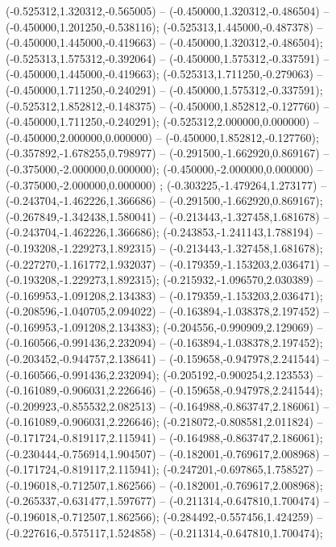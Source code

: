  (-0.525312,1.320312,-0.565005) -- (-0.450000,1.320312,-0.486504) -- (-0.450000,1.201250,-0.538116);
 (-0.525313,1.445000,-0.487378) -- (-0.450000,1.445000,-0.419663) -- (-0.450000,1.320312,-0.486504);
 (-0.525313,1.575312,-0.392064) -- (-0.450000,1.575312,-0.337591) -- (-0.450000,1.445000,-0.419663);
 (-0.525313,1.711250,-0.279063) -- (-0.450000,1.711250,-0.240291) -- (-0.450000,1.575312,-0.337591);
 (-0.525312,1.852812,-0.148375) -- (-0.450000,1.852812,-0.127760) -- (-0.450000,1.711250,-0.240291);
 (-0.525312,2.000000,0.000000) -- (-0.450000,2.000000,0.000000) -- (-0.450000,1.852812,-0.127760);
 (-0.357892,-1.678255,0.798977) -- (-0.291500,-1.662920,0.869167) -- (-0.375000,-2.000000,0.000000);
 (-0.450000,-2.000000,0.000000) -- (-0.375000,-2.000000,0.000000) ;
 (-0.303225,-1.479264,1.273177) -- (-0.243704,-1.462226,1.366686) -- (-0.291500,-1.662920,0.869167);
 (-0.267849,-1.342438,1.580041) -- (-0.213443,-1.327458,1.681678) -- (-0.243704,-1.462226,1.366686);
 (-0.243853,-1.241143,1.788194) -- (-0.193208,-1.229273,1.892315) -- (-0.213443,-1.327458,1.681678);
 (-0.227270,-1.161772,1.932037) -- (-0.179359,-1.153203,2.036471) -- (-0.193208,-1.229273,1.892315);
 (-0.215932,-1.096570,2.030389) -- (-0.169953,-1.091208,2.134383) -- (-0.179359,-1.153203,2.036471);
 (-0.208596,-1.040705,2.094022) -- (-0.163894,-1.038378,2.197452) -- (-0.169953,-1.091208,2.134383);
 (-0.204556,-0.990909,2.129069) -- (-0.160566,-0.991436,2.232094) -- (-0.163894,-1.038378,2.197452);
 (-0.203452,-0.944757,2.138641) -- (-0.159658,-0.947978,2.241544) -- (-0.160566,-0.991436,2.232094);
 (-0.205192,-0.900254,2.123553) -- (-0.161089,-0.906031,2.226646) -- (-0.159658,-0.947978,2.241544);
 (-0.209923,-0.855532,2.082513) -- (-0.164988,-0.863747,2.186061) -- (-0.161089,-0.906031,2.226646);
 (-0.218072,-0.808581,2.011824) -- (-0.171724,-0.819117,2.115941) -- (-0.164988,-0.863747,2.186061);
 (-0.230444,-0.756914,1.904507) -- (-0.182001,-0.769617,2.008968) -- (-0.171724,-0.819117,2.115941);
 (-0.247201,-0.697865,1.758527) -- (-0.196018,-0.712507,1.862566) -- (-0.182001,-0.769617,2.008968);
 (-0.265337,-0.631477,1.597677) -- (-0.211314,-0.647810,1.700474) -- (-0.196018,-0.712507,1.862566);
 (-0.284492,-0.557456,1.424259) -- (-0.227616,-0.575117,1.524858) -- (-0.211314,-0.647810,1.700474);
